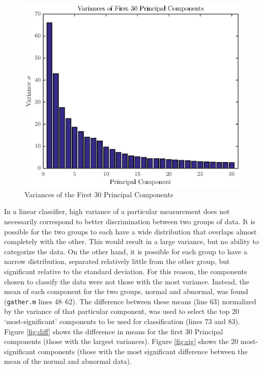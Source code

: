 \documentclass[12pt,letter]{article}
\begin{document}
\begin{figure}[htbp]
    \centering
    \includegraphics[height=0.42\textheight]{../figures/train_02}
    \caption{Variances of the First 30 Principal Components}
    \label{fig:var}
\end{figure}

In a linear classifier, high variance of a particular measurement does not
necessarily correspond to better discrimination between two groups of data.  It
is possible for the two groups to each have a wide distribution that overlaps
almost completely with the other.  This would result in a large variance, but no
ability to categorize the data.  On the other hand, it is possible for each
group to have a narrow distribution, separated relatively little from the other
group, but significant relative to the standard deviation.  For this reason, the
components chosen to classify the data were not those with the most variance.
Instead, the mean of each component for the two groups, normal and abnormal, was
found (\verb`gather.m` lines 48--62).  The difference between these means (line
63) normalized by the variance of that particular component, was used to select
the top 20 `most-significant' components to be used for classification (lines 73
and 83).  Figure \ref{fig:diff} shows the difference in means for the first 30
Principal components (those with the largest variances).  Figure \ref{fig:sig}
shows the 20 most-significant components (those with the most significant
difference between the mean of the normal and abnormal data).  
\end{document}

